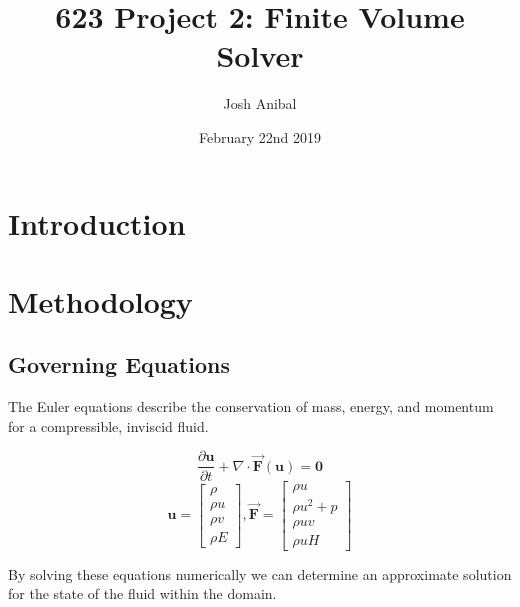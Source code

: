 \documentclass{article}
\title{623 Project 2: Finite Volume Solver}
\author{Josh Anibal}
\date{February 22nd 2019}
\begin{document}
\label{Eqn:DE}
\maketitle

\section*{Introduction}



\section{Methodology}

\subsection{Governing Equations}
	The Euler equations describe the conservation of mass, energy, and momentum for a compressible, inviscid fluid.



	\begin{equation}
		\frac{\partial \mathcal{\mathbf{u} }}   {\partial t}
		+ \nabla   \cdot \vec{\mathbf{F}}(\mathbf{u})  = \mathbf{0}
		\label{eqn:Euler}
	\end{equation}
	\begin{equation*}
		\mathbf{u} =
		\begin{bmatrix}
			\rho \\ \rho u \\ \rho v \\ \rho E
		\end{bmatrix}
		,
		\mathbf{\vec{F}} =
		\begin{bmatrix}
			\rho u \\ \rho u^2 + p \\ \rho uv \\ \rho u H
		\end{bmatrix}
	\end{equation*}

	By solving these equations numerically we can determine an approximate solution for the state of the fluid within the domain.
\end{document}
